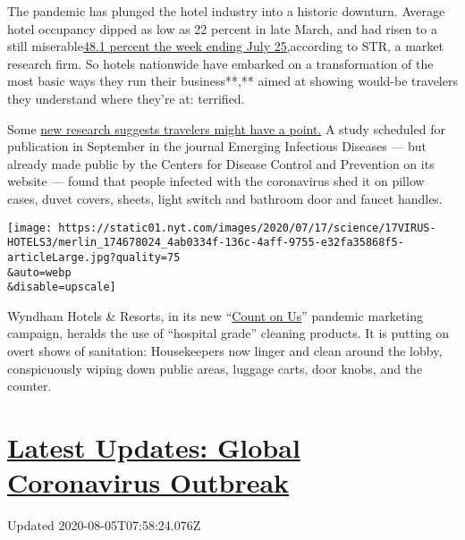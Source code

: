 The pandemic has plunged the hotel industry into a historic downturn.
Average hotel occupancy dipped as low as 22 percent in late March, and
had risen to a still
miserable\href{https://str.com/press-release/str-us-hotel-results-week-ending-25-july}{48.1
percent the week ending July
25,}\href{https://str.com/press-release/str-canada-hotel-results-week-ending-4-july}{}according
to STR, a market research firm. So hotels nationwide have embarked on a
transformation of the most basic ways they run their business**,** aimed
at showing would-be travelers they understand where they're at:
terrified.

Some \href{https://wwwnc.cdc.gov/eid/article/26/9/20-1435_article}{new
research suggests travelers might have a point.} A study scheduled for
publication in September in the journal Emerging Infectious Diseases ---
but already made public by the Centers for Disease Control and
Prevention on its website --- found that people infected with the
coronavirus shed it on pillow cases, duvet covers, sheets, light switch
and bathroom door and faucet handles.

\texttt{[image: https://static01.nyt.com/images/2020/07/17/science/17VIRUS-HOTELS3/merlin\_174678024\_4ab0334f-136c-4aff-9755-e32fa35868f5-articleLarge.jpg?quality=75\\\&auto=webp\\\&disable=upscale]}

Wyndham Hotels \& Resorts, in its new
``\href{https://www.wyndhamhotels.com/about-us/count-on-us}{Count on
Us}'' pandemic marketing campaign, heralds the use of ``hospital grade''
cleaning products. It is putting on overt shows of sanitation:
Housekeepers now linger and clean around the lobby, conspicuously wiping
down public areas, luggage carts, door knobs, and the counter.

\hypertarget{latest-updates-global-coronavirus-outbreak}{%
\section{\texorpdfstring{\href{https://www.nytimes.com/2020/08/04/world/coronavirus-cases.html?action=click\&pgtype=Article\&state=default\&region=MAIN_CONTENT_1\&context=storylines_live_updates}{Latest
Updates: Global Coronavirus
Outbreak}}{Latest Updates: Global Coronavirus Outbreak}}\label{latest-updates-global-coronavirus-outbreak}}

Updated 2020-08-05T07:58:24.076Z

